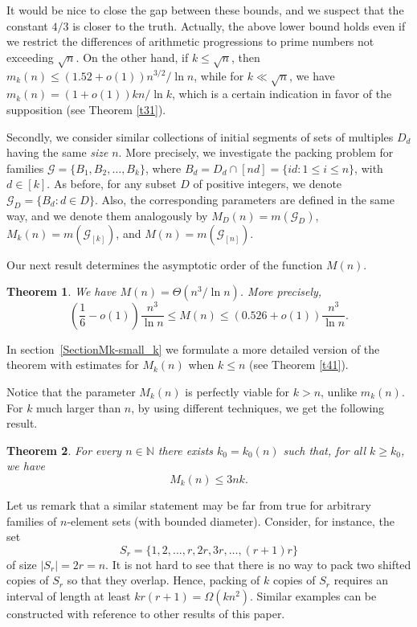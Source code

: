 \documentclass[12pt]{amsart}
\newtheorem{theorem}{Theorem}
\theoremstyle{plain}
\numberwithin{equation}{section}
\begin{document}
It would be nice to close the gap between these bounds, and we suspect that the constant $4/3$ is closer to the truth. Actually, the above lower bound holds even if we restrict the differences of arithmetic progressions to prime numbers not exceeding $\sqrt{n}$. On the other hand, if $k\leqslant \sqrt{n}$, then $m_k(n)\leqslant (1.52+o(1))n^{3/2}/\ln n$, while for $k\ll\sqrt{n}$, we have $m_k(n) = (1+o(1))kn/\ln k$, which is a certain indication in favor of the supposition (see Theorem \ref{t31}).

Secondly, we consider similar collections of initial segments of sets of multiples $D_d$ having the same \emph{size} $n$. More precisely, we investigate the packing problem for families $\mathcal{G}=\{B_1,B_2,\ldots, B_k\}$, where $B_d=D_d\cap [nd]=\{id:1\leqslant i\leqslant n\}$, with $d\in [k]$. As before, for any subset $D$ of positive integers, we denote $\mathcal{G}_D=\{B_d:d\in D\}$. Also, the corresponding parameters are defined in the same way, and we denote them analogously by $M_D(n)=m(\mathcal{G}_{D})$, $M_k(n)=m(\mathcal{G}_{[k]})$, and $M(n)=m(\mathcal{G}_{[n]})$.

Our next result determines the asymptotic order of the function $M(n)$.

\begin{theorem} \label{t12}
	We have $M(n)=\Theta(n^3/\ln n)$. More precisely,
	$$\left(\frac16-o(1)\right) \frac{n^{3}}{\ln n} \leqslant  M(n) \leqslant \left(0.526+o(1)\right)
	\frac{n^{3}}{\ln n}.$$
\end{theorem}

In section~\ref{SectionMk-small_k} we formulate a more detailed version of the theorem 
with estimates for $M_k(n)$ when $k\leqslant n$ (see Theorem \ref{t41}).

Notice that the parameter $M_k(n)$ is perfectly viable for $k>n$, unlike $m_k(n)$. 
For $k$ much larger than $n$, by using different techniques, 
we get the following result.

\begin{theorem} \label{t13}
	For every $n\in \mathbb{N}$ there exists $k_0=k_0(n)$ such that, for all $k\geqslant k_0$, we have 
$$M_k(n) \leqslant 3nk.$$
\end{theorem}

Let us remark that a similar statement may be far from true for arbitrary families of $n$-element sets (with bounded diameter). Consider, for instance, the set $$S_r=\{1,2,\ldots, r, 2r, 3r, \ldots, (r+1) r\}$$ of size $|S_r|=2r=n$. It is not hard to see that there is no way to pack two shifted copies of $S_r$ so that they overlap. Hence, packing of $k$ copies of $S_r$ requires an interval of length at least $kr(r+1)=\Omega(kn^2)$. Similar examples can be constructed with reference to other results of this paper.
\end{document}
